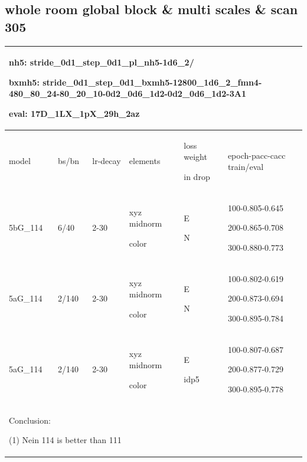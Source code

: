 \documentclass{article}
\begin{document}
\subsection{whole room global block \& multi scales \& scan 305}
\begin{tabular}{|p{1.5cm}|p{1.5cm}|p{1cm}|p{2cm}|p{1.5cm}|p{6cm}| }
	\hline
	\multicolumn{6}{|p{12cm}|}{nh5: stride\_0d1\_step\_0d1\_pl\_nh5-1d6\_2/ \par bxmh5:  stride\_0d1\_step\_0d1\_bxmh5-12800\_1d6\_2\_fmn4-480\_80\_24-80\_20\_10-0d2\_0d6\_1d2-0d2\_0d6\_1d2-3A1 \par eval: 17D\_1LX\_1pX\_29h\_2az } \\
	\hline
	model & bs/bn& lr-decay & elements & loss weight\par in drop & epoch-pacc-cacc train/eval \\
	\hline
	5bG\_114 & 6/40 &2-30 & xyz midnorm\par color& E\par N &100-0.805-0.645\par 200-0.865-0.708 \par 300-0.880-0.773  \\
	\hline
	5aG\_114 & 2/140 &2-30 & xyz midnorm\par color& E\par N &100-0.802-0.619\par 200-0.873-0.694 \par 300-0.895-0.784  \\
	\hline
	5aG\_114 & 2/140 &2-30 & xyz midnorm\par color& E\par idp5 &100-0.807-0.687\par 200-0.877-0.729 \par 300-0.895-0.778  \\
	\hline
	
	\multicolumn{6}{|p{12cm}|}{ Conclusion:\par	(1) Nein 114 is better than 111  } \\
	\hline
\end{tabular}	
\end{document}
